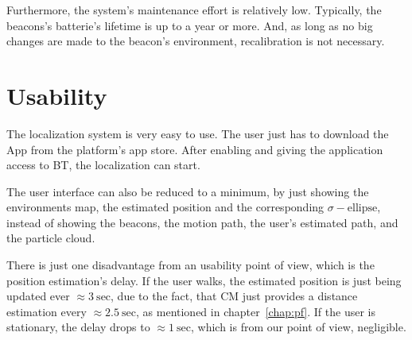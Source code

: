 Furthermore, the system's maintenance effort is relatively low. Typically, the beacons's batterie's lifetime is up to a year or more. And, as long as no big changes are made to the beacon's environment, recalibration is not necessary.

\section{Usability}
The localization system is very easy to use. The user just has to download the App from the platform's app store. After enabling and giving the application access to \acl{BT}, the localization can start.

The user interface can also be reduced to a minimum, by just showing the environments map, the estimated position and the corresponding $\sigma-\text{ellipse}$, instead of showing the beacons, the motion path, the user's estimated path, and the particle cloud.

There is just one disadvantage from an usability point of view, which is the position estimation's delay. If the user walks, the estimated position is just being updated ever $\approx 3~\text{sec}$, due to the fact, that \acs{CM} just provides a distance estimation every $\approx 2.5~\text{sec}$, as mentioned in chapter~\ref{chap:pf}. If the user is stationary, the delay drops to $\approx 1~\text{sec}$, which is from our point of view, negligible. 
